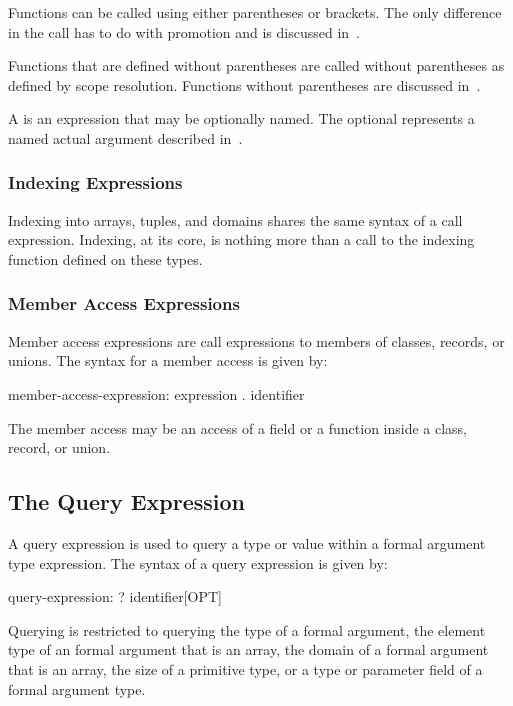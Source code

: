 Functions can be called using either parentheses or brackets.  The
only difference in the call has to do with promotion and is discussed
in~.

Functions that are defined without parentheses are called without
parentheses as defined by scope resolution.  Functions without
parentheses are discussed in~.

A  is an expression that may be optionally
named.  The optional  represents a named actual
argument described in~.

\subsubsection{Indexing Expressions}
\label{Indexing_Expressions}

Indexing into arrays, tuples, and domains shares the same syntax of a
call expression.  Indexing, at its core, is nothing more than a call
to the indexing function defined on these types.

\subsubsection{Member Access Expressions}
\label{Member_Access_Expressions}

Member access expressions are call expressions to members of classes,
records, or unions.  The syntax for a member access is given by:
\begin{syntax}
member-access-expression:
  expression . identifier
\end{syntax}
The member access may be an access of a field or a function inside a
class, record, or union.

\subsection{The Query Expression}
\label{The_Query_Expression}

A query expression is used to query a type or value within a formal
argument type expression.  The syntax of a query expression is given
by:
\begin{syntax}
query-expression:
  ? identifier[OPT]
\end{syntax}
Querying is restricted to querying the type of a formal argument, the
element type of an formal argument that is an array, the domain of a
formal argument that is an array, the size of a primitive type, or a
type or parameter field of a formal argument type.

